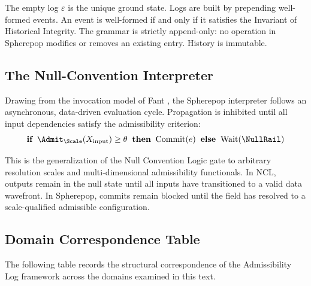 \documentclass[11pt,oneside]{book}
\begin{document}
The empty log $\varepsilon$ is the unique ground state. Logs are built by prepending well-formed events. An event is well-formed if and only if it satisfies the Invariant of Historical Integrity. The grammar is strictly append-only: no operation in Spherepop modifies or removes an existing entry. History is immutable.

\subsection{The Null-Convention Interpreter}

Drawing from the invocation model of Fant \cite{fant2006}, the Spherepop interpreter follows an asynchronous, data-driven evaluation cycle. Propagation is inhibited until all input dependencies satisfy the admissibility criterion:
\begin{equation}
    \textbf{if}\;\; \Admit_\Scale(X_{\mathrm{input}}) \ge \theta \;\;\textbf{then}\;\; \mathrm{Commit}(e) \;\;\textbf{else}\;\; \mathrm{Wait}(\NullRail)
\end{equation}

This is the generalization of the Null Convention Logic gate to arbitrary resolution scales and multi-dimensional admissibility functionals. In NCL, outputs remain in the null state until all inputs have transitioned to a valid data wavefront. In Spherepop, commits remain blocked until the field has resolved to a scale-qualified admissible configuration.

\subsection{Domain Correspondence Table}

The following table records the structural correspondence of the Admissibility Log framework across the domains examined in this text.
\end{document}
